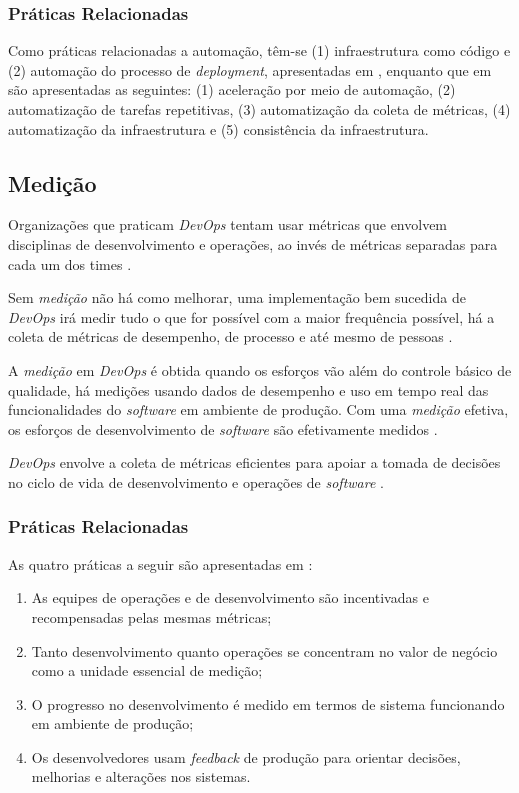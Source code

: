 \subsubsection{Práticas Relacionadas}

Como práticas relacionadas a automação, têm-se (1) infraestrutura como código
e (2) automação do processo de \textit{deployment}, apresentadas em
\cite{extending_dimensions}, enquanto que em \cite{characterizing_devops} são
apresentadas as seguintes: (1) aceleração por meio de automação, (2)
automatização de tarefas repetitivas, (3) automatização da coleta de métricas,
(4) automatização da infraestrutura e (5) consistência da infraestrutura.

\subsection{Medição}

Organizações que praticam \textit{DevOps} tentam usar métricas que envolvem
disciplinas de desenvolvimento e operações, ao invés de métricas separadas
para cada um dos times \cite{qualitative_devops_journalsw_17}.

Sem \emph{medição} não há como melhorar, uma implementação bem sucedida de
\textit{DevOps} irá medir tudo o que for possível com a maior frequência
possível, há a coleta de métricas de desempenho, de processo e até mesmo de
pessoas \cite{what_devops_means_2010}.

A \emph{medição} em \textit{DevOps} é obtida quando os esforços vão além do
controle básico de qualidade, há medições usando dados de desempenho e uso em
tempo real das funcionalidades do \textit{software} em ambiente de produção.
Com uma \emph{medição} efetiva, os esforços de desenvolvimento de
\textit{software} são efetivamente medidos \cite{dimensions_of_devops}.

\textit{DevOps} envolve a coleta de métricas eficientes para apoiar a tomada
de decisões no ciclo de vida de desenvolvimento e operações de
\textit{software} \cite{characterizing_devops}.

\subsubsection{Práticas Relacionadas}

As quatro práticas a seguir são apresentadas em \cite{extending_dimensions}:

\begin{enumerate}
\item As equipes de operações e de desenvolvimento são incentivadas e
recompensadas pelas mesmas métricas;
\item Tanto desenvolvimento quanto operações se concentram no valor de negócio
como a unidade essencial de medição;
\item O progresso no desenvolvimento é medido em termos de sistema
funcionando em ambiente de produção;
\item Os desenvolvedores usam \textit{feedback} de produção para orientar
decisões, melhorias e alterações nos sistemas.
\end{enumerate}

